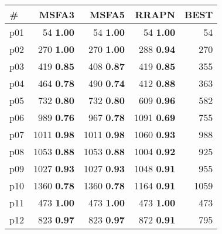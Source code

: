 \begin{tabular}{lrrrr}
\toprule
\textbf{\#} & \textbf{MSFA3} & \textbf{MSFA5} & \textbf{RRAPN} & \textbf{BEST}\\
\midrule
\multicolumn{1}{l|}{p01} & {\footnotesize 54} \textbf{1.00} & {\footnotesize 54} \textbf{1.00} & {\footnotesize 54} \textbf{1.00} & \multicolumn{1}{|r}{54}\\
\multicolumn{1}{l|}{p02} & {\footnotesize 270} \textbf{1.00} & {\footnotesize 270} \textbf{1.00} & {\footnotesize 288} \textbf{0.94} & \multicolumn{1}{|r}{270}\\
\multicolumn{1}{l|}{p03} & {\footnotesize 419} \textbf{0.85} & {\footnotesize 408} \textbf{0.87} & {\footnotesize 419} \textbf{0.85} & \multicolumn{1}{|r}{355}\\
\multicolumn{1}{l|}{p04} & {\footnotesize 464} \textbf{0.78} & {\footnotesize 490} \textbf{0.74} & {\footnotesize 412} \textbf{0.88} & \multicolumn{1}{|r}{363}\\
\multicolumn{1}{l|}{p05} & {\footnotesize 732} \textbf{0.80} & {\footnotesize 732} \textbf{0.80} & {\footnotesize 609} \textbf{0.96} & \multicolumn{1}{|r}{582}\\
\multicolumn{1}{l|}{p06} & {\footnotesize 989} \textbf{0.76} & {\footnotesize 967} \textbf{0.78} & {\footnotesize 1091} \textbf{0.69} & \multicolumn{1}{|r}{755}\\
\multicolumn{1}{l|}{p07} & {\footnotesize 1011} \textbf{0.98} & {\footnotesize 1011} \textbf{0.98} & {\footnotesize 1060} \textbf{0.93} & \multicolumn{1}{|r}{988}\\
\multicolumn{1}{l|}{p08} & {\footnotesize 1053} \textbf{0.88} & {\footnotesize 1053} \textbf{0.88} & {\footnotesize 1004} \textbf{0.92} & \multicolumn{1}{|r}{925}\\
\multicolumn{1}{l|}{p09} & {\footnotesize 1027} \textbf{0.93} & {\footnotesize 1027} \textbf{0.93} & {\footnotesize 1048} \textbf{0.91} & \multicolumn{1}{|r}{955}\\
\multicolumn{1}{l|}{p10} & {\footnotesize 1360} \textbf{0.78} & {\footnotesize 1360} \textbf{0.78} & {\footnotesize 1164} \textbf{0.91} & \multicolumn{1}{|r}{1059}\\
\multicolumn{1}{l|}{p11} & {\footnotesize 473} \textbf{1.00} & {\footnotesize 473} \textbf{1.00} & {\footnotesize 473} \textbf{1.00} & \multicolumn{1}{|r}{473}\\
\multicolumn{1}{l|}{p12} & {\footnotesize 823} \textbf{0.97} & {\footnotesize 823} \textbf{0.97} & {\footnotesize 872} \textbf{0.91} & \multicolumn{1}{|r}{795}\\

\end{tabular}

